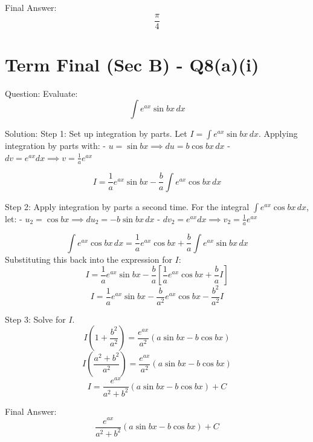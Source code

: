 \documentclass{article}
\begin{document}
Final Answer:
\[
\boxed{\frac{\pi}{4}}
\]

\section*{Term Final (Sec B) - Q8(a)(i)}
Question:
Evaluate:
\[
\int e^{ax} \sin bx \, dx
\]

Solution:
Step 1: Set up integration by parts.
Let $I = \int e^{ax} \sin bx \, dx$.
Applying integration by parts with:
- $u = \sin bx \implies du = b\cos bx \, dx$
- $dv = e^{ax} dx \implies v = \frac{1}{a} e^{ax}$

\[
I = \frac{1}{a} e^{ax} \sin bx - \frac{b}{a} \int e^{ax} \cos bx \, dx
\]

Step 2: Apply integration by parts a second time.
For the integral $\int e^{ax} \cos bx \, dx$, let:
- $u_2 = \cos bx \implies du_2 = -b\sin bx \, dx$
- $dv_2 = e^{ax} dx \implies v_2 = \frac{1}{a} e^{ax}$

\[
\int e^{ax} \cos bx \, dx = \frac{1}{a} e^{ax} \cos bx + \frac{b}{a} \int e^{ax} \sin bx \, dx
\]
Substituting this back into the expression for $I$:
\[
I = \frac{1}{a} e^{ax} \sin bx - \frac{b}{a} \left[ \frac{1}{a} e^{ax} \cos bx + \frac{b}{a} I \right]
\]
\[
I = \frac{1}{a} e^{ax} \sin bx - \frac{b}{a^2} e^{ax} \cos bx - \frac{b^2}{a^2} I
\]

Step 3: Solve for $I$.
\[
I \left( 1 + \frac{b^2}{a^2} \right) = \frac{e^{ax}}{a^2} (a\sin bx - b\cos bx)
\]
\[
I \left( \frac{a^2+b^2}{a^2} \right) = \frac{e^{ax}}{a^2} (a\sin bx - b\cos bx)
\]
\[
I = \frac{e^{ax}}{a^2+b^2} (a\sin bx - b\cos bx) + C
\]

Final Answer:
\[
\boxed{\frac{e^{ax}}{a^2+b^2} (a\sin bx - b\cos bx) + C}
\]

\end{document}
